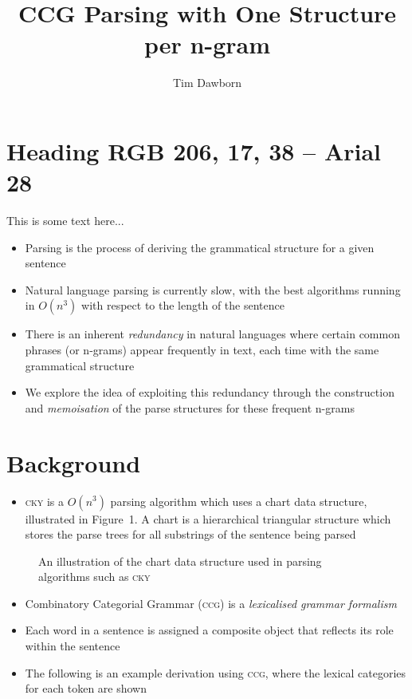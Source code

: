 \documentclass[portrait]{usydposter}
\title{CCG Parsing with One Structure per n-gram}
\author{Tim Dawborn}
\newcommand{\acronym}[1]{\textsc{#1}\xspace}
\newcommand{\ngram}{n-gram\xspace}
\newcommand{\ngrams}{{\ngram}s\xspace}
\newcommand{\ccg}{\acronym{ccg}}
\newcommand{\cky}{\acronym{cky}}
\begin{document}
\makeheader

\begin{multicols}{3}

\section{Heading RGB 206, 17, 38 -- Arial 28}
\noindent This is some text here...

\begin{itemize}
  \item Parsing is the process of deriving the grammatical structure for a given sentence
  \item Natural language parsing is currently slow, with the best algorithms running in $O(n^3)$ with respect to the length of the sentence
  \item There is an inherent \emph{redundancy} in natural languages where certain common phrases (or \ngrams) appear frequently in text, each time with the same grammatical structure
  \item We explore the idea of exploiting this redundancy through the construction and \emph{memoisation} of the parse structures for these frequent \ngrams
\end{itemize}


\section{Background}
\begin{itemize}
  \item \cky is a $O(n^3)$ parsing algorithm which uses a chart data structure, illustrated in Figure~1. A chart is a hierarchical triangular structure  which stores the parse trees for all substrings of the sentence being parsed
\end{itemize}

\begin{figure}
  \caption{An illustration of the chart data structure used in parsing algorithms such as \cky}
\end{figure}

\begin{itemize}
  \item Combinatory Categorial Grammar (\ccg) \cite{steedman:00} is a \emph{lexicalised grammar formalism}
  \item Each word in a sentence is assigned a composite object that reflects its role within the sentence
  \item The following is an example derivation using \ccg, where the lexical categories for each token are shown
\end{itemize}


\end{multicols}
\end{document}
